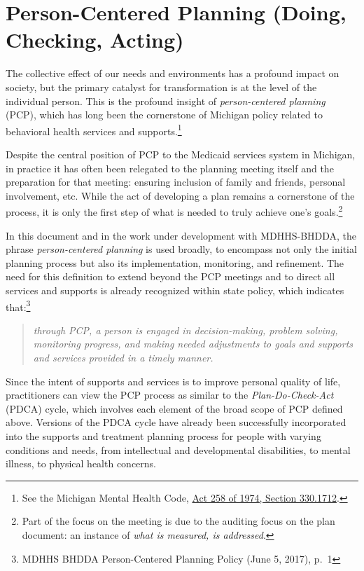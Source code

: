 \documentclass[
]{book}
\begin{document}
\hypertarget{pcpdca}{%
\chapter{Person-Centered Planning (Doing, Checking, Acting)}\label{pcpdca}}

The collective effect of our needs and environments has a profound impact on society, but the primary catalyst for transformation is at the level of the individual person. This is the profound insight of \emph{person-centered planning} (PCP), which has long been the cornerstone of Michigan policy related to behavioral health services and supports.\footnote{See the Michigan Mental Health Code, \href{http://legislature.mi.gov/doc.aspx?mcl-330-1712}{Act 258 of 1974, Section 330.1712}.}

Despite the central position of PCP to the Medicaid services system in Michigan, in practice it has often been relegated to the planning meeting itself and the preparation for that meeting: ensuring inclusion of family and friends, personal involvement, etc. While the act of developing a plan remains a cornerstone of the process, it is only the first step of what is needed to truly achieve one's goals.\footnote{Part of the focus on the meeting is due to the auditing focus on the plan document: an instance of \emph{what is measured, is addressed}.}

In this document and in the work under development with MDHHS-BHDDA, the phrase \emph{person-centered planning} is used broadly, to encompass not only the initial planning process but also its implementation, monitoring, and refinement. The need for this definition to extend beyond the PCP meetings and to direct all services and supports is already recognized within state policy, which indicates that:\footnote{MDHHS BHDDA Person-Centered Planning Policy (June 5, 2017), p.~1}

\begin{quote}
\emph{through PCP, a person is engaged in decision-making, problem solving, monitoring progress, and making needed adjustments to goals and supports and services provided in a timely manner.}
\end{quote}

Since the intent of supports and services is to improve personal quality of life, practitioners can view the PCP process as similar to the \emph{Plan-Do-Check-Act} (PDCA) cycle, which involves each element of the broad scope of PCP defined above. Versions of the PDCA cycle have already been successfully incorporated into the supports and treatment planning process for people with varying conditions and needs, from intellectual and developmental disabilities, to mental illness, to physical health concerns.
\end{document}
